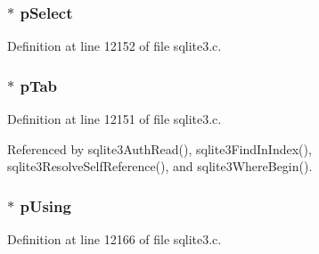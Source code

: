 \hypertarget{struct_src_list_1_1_src_list__item_ab0e0ccc47de126415a7ad889ff1d228a}{}
\subsubsection[{p\+Select}]{$\ast$ p\+Select}\label{struct_src_list_1_1_src_list__item_ab0e0ccc47de126415a7ad889ff1d228a}


Definition at line 12152 of file sqlite3.\+c.

\hypertarget{struct_src_list_1_1_src_list__item_a11b1abc167f386db2ab7fc634c880c26}{}
\subsubsection[{p\+Tab}]{$\ast$ p\+Tab}\label{struct_src_list_1_1_src_list__item_a11b1abc167f386db2ab7fc634c880c26}


Definition at line 12151 of file sqlite3.\+c.



Referenced by sqlite3\+Auth\+Read(), sqlite3\+Find\+In\+Index(), sqlite3\+Resolve\+Self\+Reference(), and sqlite3\+Where\+Begin().

\hypertarget{struct_src_list_1_1_src_list__item_a6f5772207b3daabe55903e5db1e0e985}{}
\subsubsection[{p\+Using}]{$\ast$ p\+Using}\label{struct_src_list_1_1_src_list__item_a6f5772207b3daabe55903e5db1e0e985}


Definition at line 12166 of file sqlite3.\+c.

\hypertarget{struct_src_list_1_1_src_list__item_aa04c05848c8d70309d6bb0d3d51df5e5}{}

